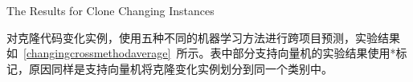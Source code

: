 
{The Results for Clone Changing Instances}

对克隆代码变化实例，使用五种不同的机器学习方法进行跨项目预测，实验结果如~\ref{changingcrossmethodaverage}~所示。表中部分支持向量机的实验结果使用{*}标记，原因同样是支持向量机将克隆变化实例划分到同一个类别中。

